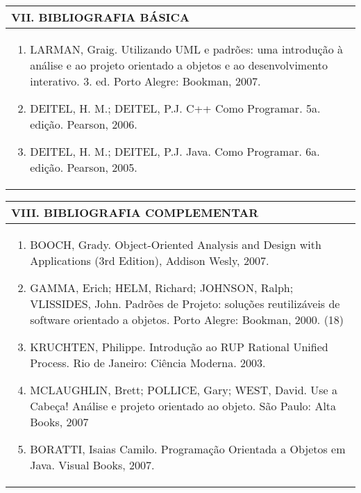 \documentclass[12pt]{article}
\begin{document}
\newpage

\begin{longtable}{|L{1.025\textwidth}|} \hline
%
{\bf VII. BIBLIOGRAFIA BÁSICA} \\ \hline
\begin{enumerate}
%
\item LARMAN, Graig. Utilizando UML e padrões: uma introdução à análise e ao projeto orientado a objetos e ao desenvolvimento interativo. 3. ed. Porto Alegre: Bookman, 2007. 
\item DEITEL, H. M.; DEITEL, P.J. C++ Como Programar. 5a. edição. Pearson, 2006. 
\item DEITEL, H. M.; DEITEL, P.J. Java. Como Programar. 6a. edição. Pearson, 2005.

\end{enumerate}
 \\ \hline
\end{longtable}



\begin{longtable}{|L{1.025\textwidth}|} \hline
%
{\bf VIII. BIBLIOGRAFIA COMPLEMENTAR} \\ \hline
\begin{enumerate}
\item  BOOCH, Grady. Object-Oriented Analysis and Design with Applications (3rd Edition), Addison Wesly, 2007. 
\item GAMMA, Erich; HELM, Richard; JOHNSON, Ralph; VLISSIDES, John. Padrões de Projeto: soluções reutilizáveis de software orientado a objetos. Porto Alegre: Bookman, 2000. (18) 
\item KRUCHTEN, Philippe. Introdução ao RUP Rational Unified Process. Rio de Janeiro: Ciência Moderna. 2003. 
\item MCLAUGHLIN, Brett; POLLICE, Gary; WEST, David. Use a Cabeça! Análise e projeto orientado ao objeto. São Paulo: Alta Books, 2007 
\item BORATTI, Isaias Camilo. Programação Orientada a Objetos em Java. Visual Books, 2007.

\end{enumerate}
 \\ \hline
\end{longtable}



\end{document}
